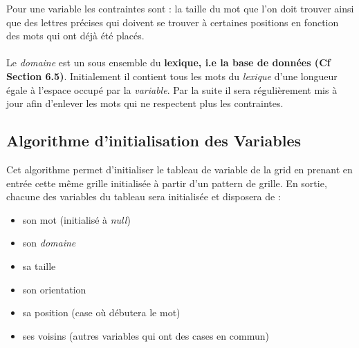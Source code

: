 \documentclass [ 11 pt ] {article}
\begin{document}
    Pour une variable les contraintes sont : la taille du mot que l'on doit trouver ainsi que des lettres précises qui doivent se trouver à certaines positions en fonction des mots qui ont déjà été placés. \\\\
    Le \textit{domaine} est un sous ensemble du \textbf{lexique, i.e la base de données (Cf Section 6.5)}. Initialement il contient tous les mots du \textit{lexique} d'une longueur égale à l'espace occupé par la \textit{variable}. Par la suite il sera régulièrement mis à jour afin d'enlever les mots qui ne respectent plus les contraintes.
        
        

    \subsection{Algorithme d'initialisation des Variables}
    Cet algorithme permet d'initialiser le tableau de variable de la grid en prenant en entrée cette même grille initialisée à partir d'un pattern de grille. En sortie, chacune des variables du tableau sera initialisée et disposera de :
    \begin{itemize}
        \item son mot (initialisé à \textit{null})
        \item son \textit{domaine} 
        \item sa taille
        \item son orientation
        \item sa position (case où débutera le mot)
        \item ses voisins (autres variables qui ont des cases en commun)
    \end{itemize}
    
\end{document}
